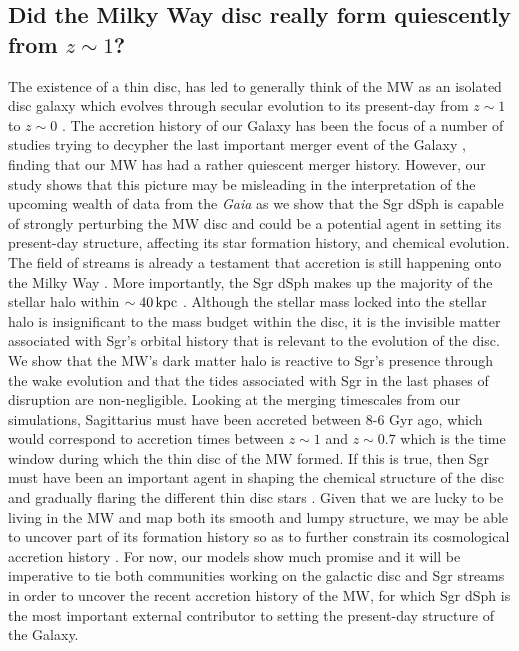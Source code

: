 \documentclass[useAMS,usenatbib]{mnras}
\begin{document}
{\subsection{Did the Milky Way disc really form quiescently from $z\sim1$?}
 The existence of a thin disc, has led to generally think of the MW as an isolated disc galaxy which evolves through secular evolution to its present-day from $z\sim1$ to $z\sim0$ \citep{freeman02}. The accretion history of our Galaxy has been the focus of a number of studies trying to decypher the last important merger event of the Galaxy \citep{ruchti15}, finding that our MW has had a rather quiescent merger history.  However, our study shows that this picture may be misleading in the interpretation of the upcoming wealth of data from the {\it Gaia} as we show that the Sgr dSph is capable of strongly perturbing the MW disc and could be a potential agent in setting its present-day structure, affecting its star formation history, and chemical evolution. The field of streams is already a testament that accretion is still happening onto the Milky Way \citep{belokurov06}. More importantly, the Sgr dSph makes up the majority of the stellar halo within $\sim40\,\rm{kpc}$ \citep{bell08,deason11a}. Although the stellar mass locked into the stellar halo is insignificant to the mass budget within the disc, it is the invisible matter associated with Sgr's orbital history that is relevant to the evolution of the disc. We show that the MW's dark matter halo is reactive to Sgr's presence through the wake evolution and that the tides associated with Sgr in the last phases of disruption are non-negligible. Looking at the merging timescales from our simulations, Sagittarius must have been accreted between 8-6 Gyr ago, which would correspond to accretion times between $z\sim1$ and $z\sim0.7$ which is the time window during which the thin disc of the MW formed. If this is true, then Sgr must have been an important agent in shaping the chemical structure of the disc \citep{hayden15} and gradually flaring the different thin disc stars \citep{minchev15}. Given that we are lucky to be living in the MW and map both its smooth and lumpy structure, we may be able to uncover part of its formation history so as to further constrain its cosmological accretion history {\bf}. For now, our models show much promise and it will be imperative to tie both communities working on the galactic disc and Sgr streams in order to uncover the recent accretion history of the MW, for which Sgr dSph is the most important external contributor to setting the present-day structure of the Galaxy.

}
\end{document}
